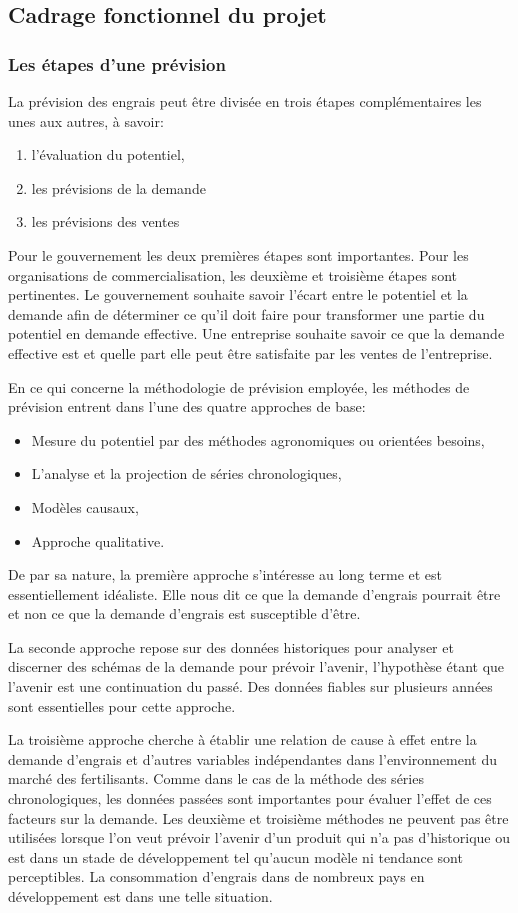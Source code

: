 	\subsection{Cadrage fonctionnel du projet}
	\subsubsection{Les étapes d'une prévision}
	La prévision des engrais peut être divisée en trois étapes complémentaires les unes aux autres, à savoir:\begin{enumerate}
	\item l'évaluation du potentiel,
	\item les prévisions de la demande
	\item les prévisions des ventes
	\end{enumerate}
	Pour le gouvernement les deux premières étapes sont importantes. Pour les organisations de commercialisation, les deuxième et troisième étapes sont pertinentes. Le gouvernement souhaite savoir l'écart entre le potentiel et la demande afin de déterminer ce qu'il doit faire pour transformer une partie du potentiel en demande effective. Une entreprise souhaite savoir ce que la demande effective est et quelle part elle peut être satisfaite par les ventes de l'entreprise.\par
	En ce qui concerne la méthodologie de prévision employée, les méthodes de prévision entrent dans l'une des quatre approches de base:\begin{itemize}
	\item Mesure du potentiel par des méthodes agronomiques ou orientées besoins, 
	\item L'analyse et la projection de séries chronologiques,
	\item Modèles causaux,
	\item Approche qualitative.
	\end{itemize}\par
	De par sa nature, la première approche s’intéresse au long terme et est essentiellement idéaliste. Elle nous dit ce que la demande d'engrais pourrait être et non ce que la demande d'engrais est susceptible d'être.\par
	La seconde approche repose sur des données historiques pour analyser et discerner des schémas de la demande pour prévoir l'avenir, l'hypothèse étant que l'avenir est une continuation du passé. Des données fiables sur plusieurs années sont essentielles pour cette approche.\par
	La troisième approche cherche à établir une relation de cause à effet entre la demande d'engrais et d'autres variables indépendantes dans l'environnement du marché des fertilisants. Comme dans le cas de la méthode des séries chronologiques, les données passées sont importantes pour évaluer l'effet de ces facteurs sur la demande. Les deuxième et troisième méthodes ne peuvent pas être utilisées lorsque l'on veut prévoir l'avenir d'un produit qui n'a pas d'historique ou est dans un stade de développement tel qu'aucun modèle ni tendance sont perceptibles. La consommation d'engrais dans de nombreux pays en développement est dans une telle situation.\par
